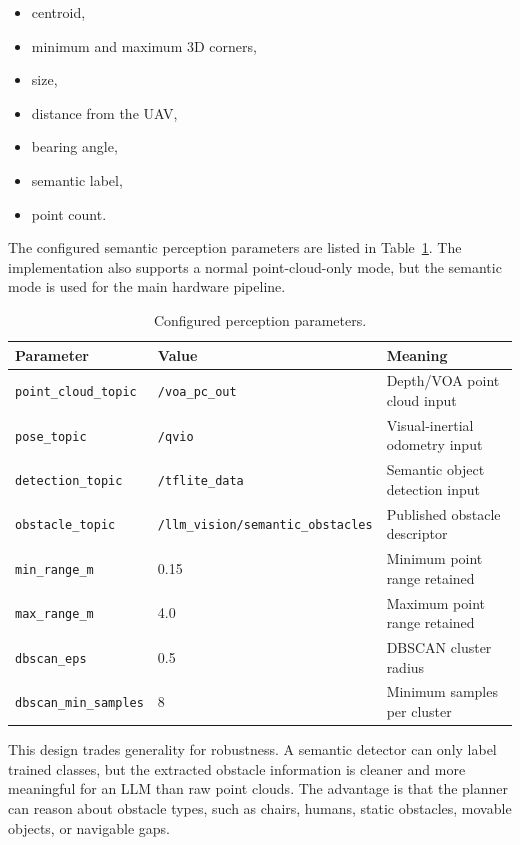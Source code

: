 \documentclass[11pt]{article}
\begin{document}
\begin{itemize}
  \item centroid,
  \item minimum and maximum 3D corners,
  \item size,
  \item distance from the UAV,
  \item bearing angle,
  \item semantic label,
  \item point count.
\end{itemize}

The configured semantic perception parameters are listed in Table~\ref{tab:perception-params}. The implementation also supports a normal point-cloud-only mode, but the semantic mode is used for the main hardware pipeline.

\begin{table}[H]
\centering
\caption{Configured perception parameters.}
\label{tab:perception-params}
\begin{tabular}{lll}
\toprule
Parameter & Value & Meaning \\
\midrule
\texttt{point\_cloud\_topic} & \texttt{/voa\_pc\_out} & Depth/VOA point cloud input \\
\texttt{pose\_topic} & \texttt{/qvio} & Visual-inertial odometry input \\
\texttt{detection\_topic} & \texttt{/tflite\_data} & Semantic object detection input \\
\texttt{obstacle\_topic} & \texttt{/llm\_vision/semantic\_obstacles} & Published obstacle descriptor \\
\texttt{min\_range\_m} & 0.15 & Minimum point range retained \\
\texttt{max\_range\_m} & 4.0 & Maximum point range retained \\
\texttt{dbscan\_eps} & 0.5 & DBSCAN cluster radius \\
\texttt{dbscan\_min\_samples} & 8 & Minimum samples per cluster \\
\bottomrule
\end{tabular}
\end{table}

This design trades generality for robustness. A semantic detector can only label trained classes, but the extracted obstacle information is cleaner and more meaningful for an LLM than raw point clouds. The advantage is that the planner can reason about obstacle types, such as chairs, humans, static obstacles, movable objects, or navigable gaps.
\end{document}
